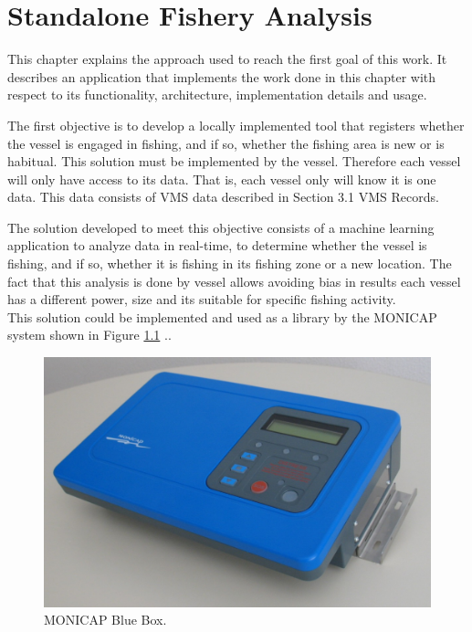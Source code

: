 % 
% 
%
\chapter{Standalone Fishery Analysis}
\label{cha:standalone_fishery_analysis}
This chapter explains the approach used to reach the first goal of this work. It describes an application that implements the work done in this chapter with respect to its functionality, architecture, implementation details and usage. 


The first objective is to develop a locally implemented tool that registers whether the vessel is engaged in fishing, and if so, whether the fishing area is new or is habitual. This solution must be implemented by the vessel. Therefore each vessel will only have access to its data. That is, each vessel only will know it is one data. This data consists of VMS data described in Section 3.1 VMS Records.

The solution developed to meet this objective consists of a machine learning application to analyze data in real-time, to determine whether the vessel is fishing, and if so, whether it is fishing in its fishing zone or a new location.
The fact that this analysis is done by vessel allows avoiding bias in results each vessel has a different power, size and its suitable for specific fishing activity.\\
This solution could be implemented and used as a library by the MONICAP system shown in Figure \ref{fig:monicap} .\cite{WEBSITE:MonicapXsealence}.

\begin{figure}[H]
\centering
\includegraphics[width=0.8\linewidth]{Chapters/img/equipamento_monicap.png}
\caption{MONICAP Blue Box.}
\label{fig:monicap}
\end{figure}

